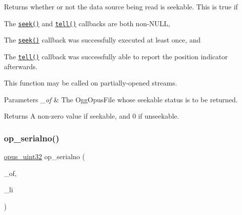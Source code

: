 Returns whether or not the data source being read is seekable. This is true if 
\begin{DoxyEnumerate}
\item The {\ttfamily \href{#op_seek_func}{\tt seek()}} and {\ttfamily \href{#op_tell_func}{\tt tell()}} callbacks are both non-\/{\ttfamily N\+U\+LL}, 
\item The {\ttfamily \href{#op_seek_func}{\tt seek()}} callback was successfully executed at least once, and 
\item The {\ttfamily \href{#op_tell_func}{\tt tell()}} callback was successfully able to report the position indicator afterwards. 
\end{DoxyEnumerate}This function may be called on partially-\/opened streams. 
\begin{DoxyParams}{Parameters}
{\em \+\_\+of} & The {\ttfamily Ogg\+Opus\+File} whose seekable status is to be returned. \\
\hline
\end{DoxyParams}
\begin{DoxyReturn}{Returns}
A non-\/zero value if seekable, and 0 if unseekable. 
\end{DoxyReturn}
\mbox{\label{group__stream__info_ga41992ce6f066e07609e5fe2ccd961f40}} 
\subsubsection{\texorpdfstring{op\+\_\+serialno()}{op\_serialno()}}
{\footnotesize\ttfamily \hyperlink{opus__types_8h_a643eaaadb9ef6cd44308e0299d8cd8ce}{opus\+\_\+uint32} op\+\_\+serialno (\begin{DoxyParamCaption}\item[{\hyperlink{zconf_8h_a2c212835823e3c54a8ab6d95c652660e}{const} Ogg\+Opus\+File $\ast$}]{\+\_\+of,  }\item[{int}]{\+\_\+li }\end{DoxyParamCaption})}

